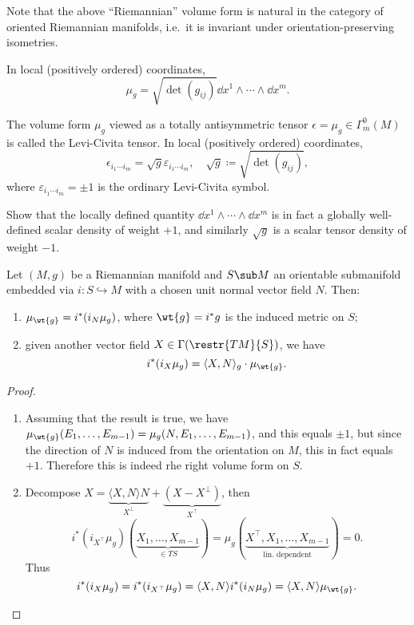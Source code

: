 Note that the above ``Riemannian'' volume form is natural in the category of oriented Riemannian manifolds, i.e.\ it is invariant under orientation-preserving isometries.

In local (positively ordered) coordinates, \[\mu_g=\sqrt{\det(g_{ij})}\dd x^1\wedge\cdots\wedge \dd x^m.\]

\begin{defn}
    The volume form $\mu_g$ viewed as a totally antisymmetric tensor $\epsilon=\mu_g\in\Gamma^0_m(M)$ is called the Levi-Civita tensor. In local (positively ordered) coordinates,
    \[\epsilon_{i_1\cdots i_m}=\sqrt g\varepsilon_{i_1\cdots i_m},\quad \sqrt g\coloneqq\sqrt{\det(g_{ij})},\]
    where $\varepsilon_{i_1\cdots i_m}=\pm 1$ is the ordinary Levi-Civita symbol.
\end{defn}

\begin{xca}
    Show that the locally defined quantity $\dd x^1\wedge\cdots \wedge\dd x^m$ is in fact a globally well-defined scalar density of weight $+1$, and similarly  $\sqrt{g}$ is a scalar tensor density of weight $-1$.
\end{xca}

\begin{prop}
    Let $(M,g)$ be a Riemannian manifold and $S\sub M$ an orientable submanifold embedded via $i:S\hookrightarrow M$ with a chosen unit normal vector field $N$. Then:
    \begin{enumerate}
        \item $\mu_{\wt{g}}=i^\ast (i_N \mu_g)$, where $\wt{g}=i^\ast g$ is the induced metric on $S$;
        \item given another vector field $X\in\Gamma(\restr{TM}{S})$, we have 
        \[i^\ast(i_X\mu_g)=\langle X,N\rangle_g \cdot \mu_{\wt{g}}.\]
    \end{enumerate}
\end{prop}
\begin{proof}
    \begin{enumerate}
        \item Assuming that the result is true, we have $\mu_{\wt{g}}(E_1,\ldots,E_{m-1})=\mu_g(N,E_1,\ldots,E_{m-1})$, and this equals $\pm 1$, but since the direction of $N$ is induced from the orientation on $M$, this in fact equals $+1$. Therefore this is indeed rhe right volume form on $S$.
        \item Decompose $X=\underbrace{\langle X,N\rangle N}_{X^\perp}+\underbrace{(X-X^\perp)}_{X^\top}$,
        then 
        \[i^\ast(i_{X^\top}\mu_g)(\underbrace{X_1,\ldots,X_{m-1}}_{\in TS})=\mu_g(\underbrace{X^\top,X_1,\ldots,X_{m-1}}_{\text{lin. dependent}})=0.\]
        Thus 
        \[i^\ast(i_X\mu_g)=i^\ast(i_{X^\top}\mu_g)=\langle X,N \rangle i^\ast (i_N \mu_g)=\langle X,N\rangle \mu_{\wt{g}}.\]
    \end{enumerate}
\end{proof}

